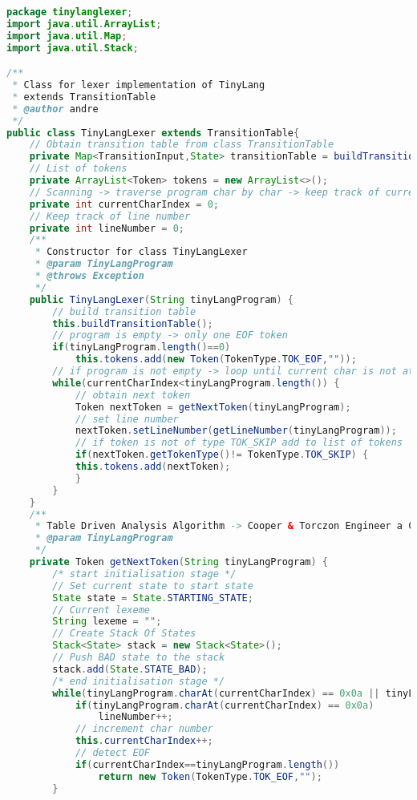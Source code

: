 \begin{lstlisting}[basicstyle=\miniscule,language=Java,caption=Table Driven Lexer,label=listing:tabledrivenlexer]
package tinylanglexer;
import java.util.ArrayList;
import java.util.Map;
import java.util.Stack;

/**
 * Class for lexer implementation of TinyLang
 * extends TransitionTable
 * @author andre
 */
public class TinyLangLexer extends TransitionTable{	
	// Obtain transition table from class TransitionTable
	private Map<TransitionInput,State> transitionTable = buildTransitionTable();
	// List of tokens
	private ArrayList<Token> tokens = new ArrayList<>();
	// Scanning -> traverse program char by char -> keep track of current char 
	private int currentCharIndex = 0;
	// Keep track of line number 
	private int lineNumber = 0;
	/**
	 * Constructor for class TinyLangLexer
	 * @param TinyLangProgram
	 * @throws Exception 
	 */
	public TinyLangLexer(String tinyLangProgram) {
		// build transition table
		this.buildTransitionTable();
		// program is empty -> only one EOF token
        if(tinyLangProgram.length()==0)
    		this.tokens.add(new Token(TokenType.TOK_EOF,""));
		// if program is not empty -> loop until current char is not at the end of file
		while(currentCharIndex<tinyLangProgram.length()) {
			// obtain next token
			Token nextToken = getNextToken(tinyLangProgram);
			// set line number
			nextToken.setLineNumber(getLineNumber(tinyLangProgram));
			// if token is not of type TOK_SKIP add to list of tokens
			if(nextToken.getTokenType()!= TokenType.TOK_SKIP) {
    		this.tokens.add(nextToken);
			}
		}
	}	
	/**
	 * Table Driven Analysis Algorithm -> Cooper & Torczon Engineer a Compiler.
	 * @param TinyLangProgram
	 */
	private Token getNextToken(String tinyLangProgram) {
		/* start initialisation stage */
		// Set current state to start state
		State state = State.STARTING_STATE;
		// Current lexeme
        String lexeme = "";
		// Create Stack Of States 
        Stack<State> stack = new Stack<State>();
        // Push BAD state to the stack
        stack.add(State.STATE_BAD);
		/* end initialisation stage */
        while(tinyLangProgram.charAt(currentCharIndex) == 0x0a || tinyLangProgram.charAt(currentCharIndex)==0x20 ||  tinyLangProgram.charAt(currentCharIndex)==0x09) {
        	if(tinyLangProgram.charAt(currentCharIndex) == 0x0a) 
        		lineNumber++;
        	// increment char number
        	this.currentCharIndex++;
            // detect EOF
         	if(currentCharIndex==tinyLangProgram.length())
        		return new Token(TokenType.TOK_EOF,"");
        }

\end{lstlisting}
